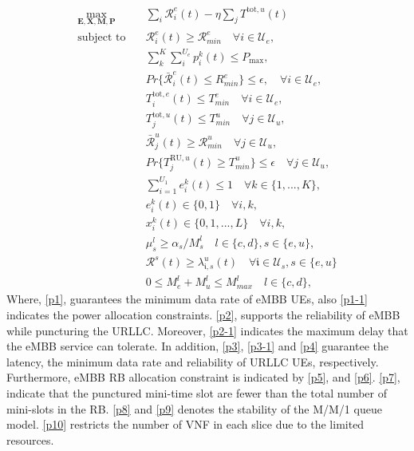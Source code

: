 \documentclass[conference]{IEEEtran}
\begin{document}
\begin{subequations} \label{mainP}
\begin{alignat}{4}
\max\limits_{ \boldsymbol{E}, \boldsymbol{X},\boldsymbol{M}, \boldsymbol{P} } &  \sum_i {\mathcal{R}}_{i}^e(t) - \eta \sum_j T^{\text{tot}, u}(t)       \ \\
\text{subject to} \quad  & {\mathcal{R}}_{i}^e(t) \geq  \mathcal{R}_{min}^e \quad \forall i \in \mathcal{U}_e, \label{p1} \\
& \sum_k^K \sum_i^{U_e} p^k_i(t) \leq P_{\text{max}},  \label{p1-1} \\ 
& Pr\{\bar{\mathcal{R}}_{i}^e(t) \leq {R}_{min}^e\}  \leq \epsilon,\quad \forall i \in \mathcal{U}_e, \label{p2}\\
&T^{\text{tot}, e}_i(t)  \leq T_{min}^e  \quad \forall i \in \mathcal{U}_e, \label{p2-1} \\
&T^{\text{tot}, u}_j(t)  \leq T_{min}^u  \quad \forall j \in \mathcal{U}_u, \label{p3} \\
& \bar{\mathcal{R}}_{j}^u(t) \geq  \mathcal{R}_{min}^u \quad \forall j \in \mathcal{U}_u, \label{p3-1} \\
&Pr\{T^{\text{RU}, u}_j(t) \geq T_{min}^u\} \leq \epsilon  \quad \forall j \in \mathcal{U}_u, \label{p4} \\
&\sum_{i=1}^{U_1}e^k_i(t)\leq 1 \quad \forall k \in \{1,...,K\},\label{p5} \\
&e^k_i(t)\in \{0,1\}  \quad \forall i,k, \label{p6} \\
& x^k_i(t)\in \{0,1,...,L\}  \quad \forall i,k, \label{p7} \\
& \mu^l_s \geq \alpha_s/M^l_s \quad l \in \{c,d\}, s\in\{e,u\}, \label{p8} \\
& {\mathcal{R}}^s(t) \geq {\lambda}_{\mathfrak{i},s}^u(t) \quad \forall \mathfrak{i} \in \mathcal{U}_s, s\in \{e,u\}\label{p9} \\
& 0 \leq M^l_e  + M^l_u \leq M_{max}^l  \quad l \in \{c,d\},\label{p10}
\end{alignat}
\label{constraints}
\end{subequations}
Where, \eqref{p1}, guarantees the minimum data rate of eMBB UEs, also \eqref{p1-1} indicates the power allocation constraints.
\eqref{p2}, supports the reliability of eMBB while puncturing the URLLC. Moreover, \eqref{p2-1} indicates the maximum delay that the eMBB service can tolerate.
In addition, \eqref{p3}, \eqref{p3-1} and \eqref{p4} guarantee the latency, the minimum data rate and reliability of URLLC UEs, respectively.
Furthermore, eMBB RB allocation constraint is indicated by \eqref{p5}, and \eqref{p6}.
\eqref{p7}, indicate that the punctured mini-time slot are fewer than the total number of mini-slots in the RB.
\eqref{p8} and \eqref{p9} denotes the stability of the M/M/1 queue model.
\eqref{p10} restricts the number of VNF in each slice due to the limited resources.
\end{document}
